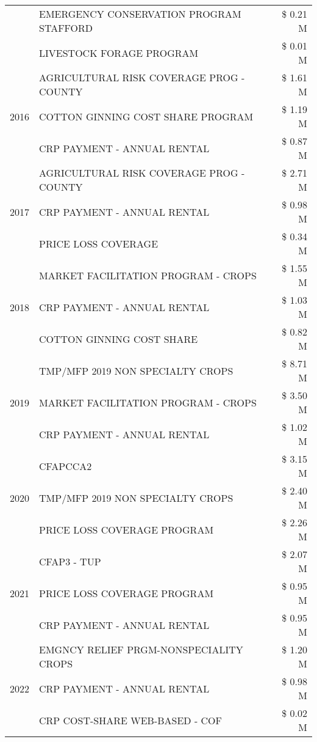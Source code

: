 \begin{tabular}{llr}
 & EMERGENCY CONSERVATION PROGRAM STAFFORD & \$ 0.21 M \\
 & LIVESTOCK FORAGE PROGRAM & \$ 0.01 M \\
\cline{1-3}
\multirow[t]{3}{*}{2016} & AGRICULTURAL RISK COVERAGE PROG - COUNTY & \$ 1.61 M \\
 & COTTON GINNING COST SHARE PROGRAM & \$ 1.19 M \\
 & CRP PAYMENT - ANNUAL RENTAL & \$ 0.87 M \\
\cline{1-3}
\multirow[t]{3}{*}{2017} & AGRICULTURAL RISK COVERAGE PROG - COUNTY & \$ 2.71 M \\
 & CRP PAYMENT - ANNUAL RENTAL & \$ 0.98 M \\
 & PRICE LOSS COVERAGE & \$ 0.34 M \\
\cline{1-3}
\multirow[t]{3}{*}{2018} & MARKET FACILITATION PROGRAM - CROPS & \$ 1.55 M \\
 & CRP PAYMENT - ANNUAL RENTAL & \$ 1.03 M \\
 & COTTON GINNING COST SHARE & \$ 0.82 M \\
\cline{1-3}
\multirow[t]{3}{*}{2019} & TMP/MFP 2019 NON SPECIALTY CROPS & \$ 8.71 M \\
 & MARKET FACILITATION PROGRAM - CROPS & \$ 3.50 M \\
 & CRP PAYMENT - ANNUAL RENTAL & \$ 1.02 M \\
\cline{1-3}
\multirow[t]{3}{*}{2020} & CFAPCCA2 & \$ 3.15 M \\
 & TMP/MFP 2019 NON SPECIALTY CROPS & \$ 2.40 M \\
 & PRICE LOSS COVERAGE PROGRAM & \$ 2.26 M \\
\cline{1-3}
\multirow[t]{3}{*}{2021} & CFAP3 - TUP & \$ 2.07 M \\
 & PRICE LOSS COVERAGE PROGRAM & \$ 0.95 M \\
 & CRP PAYMENT - ANNUAL RENTAL & \$ 0.95 M \\
\cline{1-3}
\multirow[t]{3}{*}{2022} & EMGNCY RELIEF PRGM-NONSPECIALITY CROPS & \$ 1.20 M \\
 & CRP PAYMENT - ANNUAL RENTAL & \$ 0.98 M \\
 & CRP COST-SHARE WEB-BASED - COF & \$ 0.02 M \\
\cline{1-3}
\bottomrule
\end{tabular}
